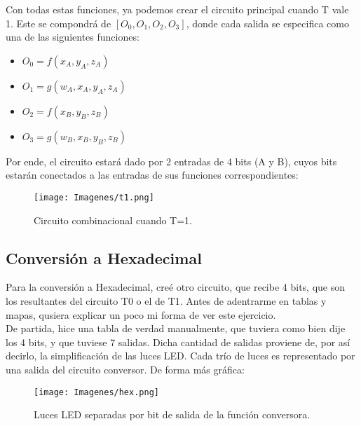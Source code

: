 \documentclass[a4paper,11pt]{article}
\begin{document}
Con todas estas funciones, ya podemos crear el circuito principal cuando T vale 1. Este se compondrá de $[O_0,O_1,O_2,O_3]$, donde cada salida se especifica como una de las siguientes funciones:
\begin{minipage}{0.48\linewidth}
\vspace{0.25cm}
\begin{itemize}
    \item $O_0 = f(x_A,y_A,z_A)$
    \item $O_1 = g(w_A,x_A,y_A,z_A)$
    \end{itemize}
    \vspace{0.25cm}
\end{minipage}
\hfill
\begin{minipage}{0.48\linewidth}
\vspace{0.25cm}
\begin{itemize}
    \item $O_2 = f(x_B,y_B,z_B)$
    \item $O_3 = g(w_B,x_B,y_B,z_B)$
\end{itemize}
\vspace{0.25cm}
\end{minipage}

Por ende, el circuito estará dado por 2 entradas de 4 bits (A y B), cuyos bits estarán conectados a las entradas de sus funciones correspondientes:

\begin{figure}[h]
    \centering
    \texttt{[image: Imagenes/t1.png]}
    \caption{Circuito combinacional cuando T=1.}
    \label{fig:t1}
\end{figure}
\subsection{Conversión a Hexadecimal}

Para la conversión a Hexadecimal, creé otro circuito, que recibe 4 bits, que son los resultantes del circuito T0 o el de T1. Antes de adentrarme en tablas y mapas, qusiera explicar un poco mi forma de ver este ejercicio.\\

De partida, hice una tabla de verdad manualmente, que tuviera como bien dije los 4 bits, y que tuviese 7 salidas. Dicha cantidad de salidas proviene de, por así decirlo, la simplificación de las luces LED. Cada trío de luces es representado por una salida del circuito conversor. De forma más gráfica:

\begin{figure}[h]
    \centering
    \texttt{[image: Imagenes/hex.png]}
    \caption{Luces LED separadas por bit de salida de la función conversora.}
    \label{fig:ledoriginal}
\end{figure}
\end{document}
